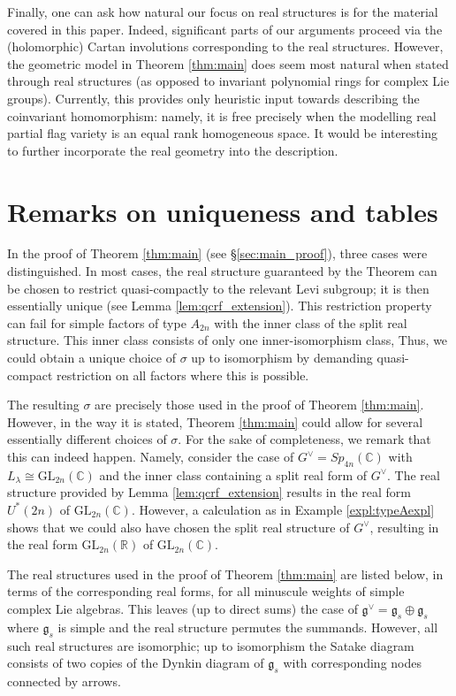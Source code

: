 \documentclass{amsart}
\newcommand{\C}{\mathbb{C}}
\newcommand{\g}{\mathfrak{g}}
\newcommand{\GL}{\mathrm{GL}}
\newcommand{\R}{\mathbb{R}}
\theoremstyle{definition}
\theoremstyle{plain}
\theoremstyle{remark}
\begin{document}
Finally, one can ask how natural our focus on real structures is for the material covered in this paper. Indeed, significant parts of our arguments proceed via the (holomorphic) Cartan involutions corresponding to the real structures. However, the geometric model in Theorem \ref{thm:main} does seem most natural when stated through real structures (as opposed to invariant polynomial rings for complex Lie groups). Currently, this provides only heuristic input towards describing the coinvariant homomorphism: namely, it is free precisely when the modelling real partial flag variety is an equal rank homogeneous space. It would be interesting to further incorporate the real geometry into the description.

\appendix

\section{Remarks on uniqueness and tables}
\label{sec:uniqueness_and_tables}
In the proof of Theorem \ref{thm:main} (see \S\ref{sec:main_proof}), three cases were distinguished. In most cases, the real structure guaranteed by the Theorem can be chosen to restrict quasi-compactly to the relevant Levi subgroup; it is then essentially unique (see Lemma \ref{lem:qcrf_extension}). This restriction property can fail for simple factors of type $A_{2n}$ with the inner class of the split real structure. This inner class consists of only one inner-isomorphism class, Thus, we could obtain a unique choice of $\sigma$ up to isomorphism by demanding quasi-compact restriction on all factors where this is possible. 

The resulting $\sigma$ are precisely those used in the proof of Theorem \ref{thm:main}. However, in the way it is stated, Theorem \ref{thm:main} could allow for several essentially different choices of $\sigma$. For the sake of completeness, we remark that this can indeed happen. Namely, consider the case of $G^\vee = Sp_{4n}(\C)$ with $L_\lambda \cong \GL_{2n}(\C)$ and the inner class containing a split real form of $G^\vee$. The real structure provided by Lemma \ref{lem:qcrf_extension} results in the real form $U^*(2n)$ of $\GL_{2n}(\C)$. However, a calculation as in Example \ref{expl:typeAexpl} shows that we could also have chosen the split real structure of $G^\vee$, resulting in the real form $\GL_{2n}(\R)$ of $\GL_{2n}(\C)$.

The real structures used in the proof of Theorem \ref{thm:main} are listed below, in terms of the corresponding real forms, for all minuscule weights of simple complex Lie algebras. This leaves (up to direct sums) the case of $\g^\vee = \g_s\oplus \g_s$ where $\g_s$ is simple and the real structure permutes the summands. However, all such real structures are isomorphic; up to isomorphism the Satake diagram consists of two copies of the Dynkin diagram of $\g_s$ with corresponding nodes connected by arrows.
\end{document}

